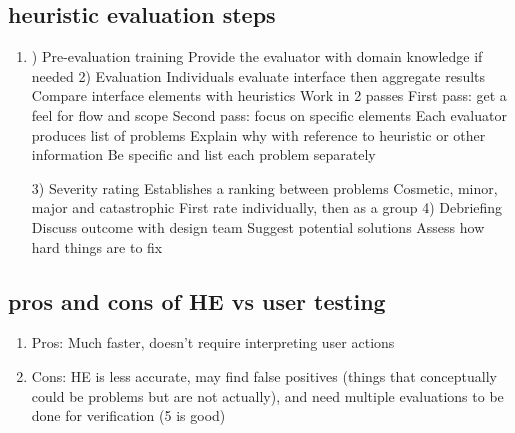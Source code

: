 \documentclass[11pt]{article}
\begin{document}
\subsection{heuristic evaluation steps}
\begin{enumerate}
    \item ) Pre-evaluation training
Provide the evaluator with domain knowledge if needed
2) Evaluation
Individuals evaluate interface then aggregate results
Compare interface elements with heuristics
Work in 2 passes
First pass: get a feel for flow and scope
Second pass: focus on specific elements
Each evaluator produces list of problems
Explain why with reference to heuristic or other information
Be specific and list each problem separately

3) Severity rating
Establishes a ranking between problems
Cosmetic, minor, major and catastrophic
First rate individually, then as a group
4) Debriefing
Discuss outcome with design team
Suggest potential solutions
Assess how hard things are to fix
\end{enumerate}


\subsection{pros and cons of HE vs user testing}
\begin{enumerate}
    \item Pros: Much faster, doesn't require interpreting user actions
    \item Cons: HE is less accurate, may find false positives (things that conceptually could be problems but are not actually), and need multiple evaluations to be done for verification (5 is good)
    
\end{enumerate}
\end{document}
